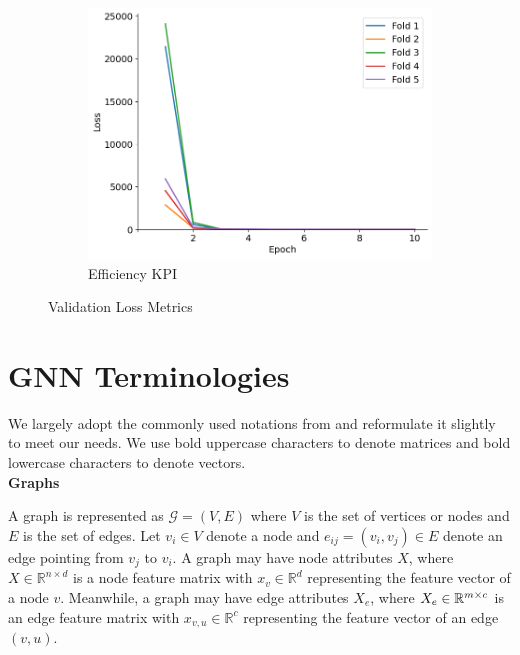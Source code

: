 \documentclass{report} %
\begin{document}
\begin{figure}[H]
\begin{subfigure}{0.32\textwidth}
        \centering
        \includegraphics[width=\textwidth]{./ReportImages/val_loss_y2.png}
        \caption{\centering Efficiency \ac{KPI}}
        \label{fig:Validation Loss for Efficiency grid}
    \end{subfigure}
    \caption{Validation Loss Metrics}
    \label{fig:Validation Loss Metrics}
\end{figure}

\section{GNN Terminologies}
\label{sec:GNN Terminologies}

We largely adopt the commonly used notations from \cite{GNN-2019} and reformulate it slightly to meet our needs.
We use bold uppercase characters to denote matrices and bold lowercase characters to denote vectors.\\

\textbf{Graphs}

A graph is represented as \( \mathcal{G} = (V, E) \) where \( V \) is the set of vertices or nodes  and \( E \) is the set of edges. 
Let \( v_i \in V \) denote a node and \( e_{ij} = (v_i, v_j) \in E \) denote an edge pointing from \( v_j \) to \( v_i \).
A graph may have node attributes \( X \), where \( X \in \mathbb{R}^{n \times d} \) is a node feature matrix with 
\( x_v \in \mathbb{R}^d \) representing the feature vector of a node \( v \). 
Meanwhile, a graph may have edge attributes \( X_e \), where \( X_e \in \mathbb{R}^{m \times \\c} \) is an edge
feature matrix with \( x_{v,u} \in \mathbb{R}^c \) representing the feature vector of an edge \( (v, u) \).\\
\end{document}
